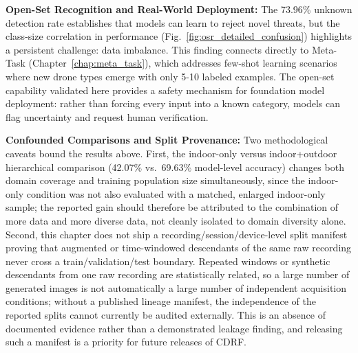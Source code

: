 \textbf{Open-Set Recognition and Real-World Deployment:} The 73.96\% unknown detection rate establishes that models can learn to reject novel threats, but the class-size correlation in performance (Fig.~\ref{fig:osr_detailed_confusion}) highlights a persistent challenge: data imbalance. This finding connects directly to Meta-Task (Chapter~\ref{chap:meta_task}), which addresses few-shot learning scenarios where new drone types emerge with only 5-10 labeled examples. The open-set capability validated here provides a safety mechanism for foundation model deployment: rather than forcing every input into a known category, models can flag uncertainty and request human verification.

\textbf{Confounded Comparisons and Split Provenance:} Two methodological caveats bound the results above. First, the indoor-only versus indoor+outdoor hierarchical comparison (42.07\% vs.\ 69.63\% model-level accuracy) changes both domain coverage and training population size simultaneously, since the indoor-only condition was not also evaluated with a matched, enlarged indoor-only sample; the reported gain should therefore be attributed to the combination of more data and more diverse data, not cleanly isolated to domain diversity alone. Second, this chapter does not ship a recording/session/device-level split manifest proving that augmented or time-windowed descendants of the same raw recording never cross a train/validation/test boundary. Repeated windows or synthetic descendants from one raw recording are statistically related, so a large number of generated images is not automatically a large number of independent acquisition conditions; without a published lineage manifest, the independence of the reported splits cannot currently be audited externally. This is an absence of documented evidence rather than a demonstrated leakage finding, and releasing such a manifest is a priority for future releases of CDRF.

